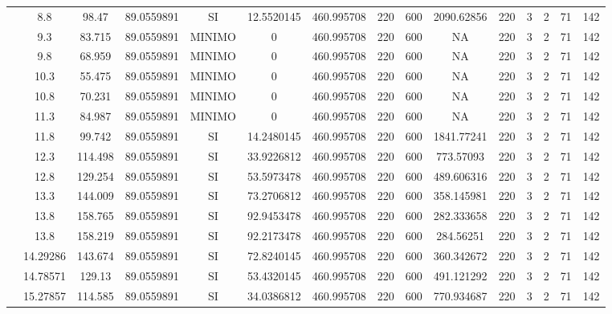 \begin{table}[H]
{\begin{tabular}{|c|c|c|c|c|c|c|c|c|c|c|c|c|c|c|}
\cline{2-15}    & 8.8 & 98.47 & 89.0559891 & SI  & 12.5520145 & 460.995708 & 220 & 600 & 2090.62856 & 220 & 3   & 2   & 71  & 142 \bigstrut\\
\cline{2-15}    & 9.3 & 83.715 & 89.0559891 & MINIMO & 0   & 460.995708 & 220 & 600 & NA  & 220 & 3   & 2   & 71  & 142 \bigstrut\\
\cline{2-15}    & 9.8 & 68.959 & 89.0559891 & MINIMO & 0   & 460.995708 & 220 & 600 & NA  & 220 & 3   & 2   & 71  & 142 \bigstrut\\
\cline{2-15}    & 10.3 & 55.475 & 89.0559891 & MINIMO & 0   & 460.995708 & 220 & 600 & NA  & 220 & 3   & 2   & 71  & 142 \bigstrut\\
\cline{2-15}    & 10.8 & 70.231 & 89.0559891 & MINIMO & 0   & 460.995708 & 220 & 600 & NA  & 220 & 3   & 2   & 71  & 142 \bigstrut\\
\cline{2-15}    & 11.3 & 84.987 & 89.0559891 & MINIMO & 0   & 460.995708 & 220 & 600 & NA  & 220 & 3   & 2   & 71  & 142 \bigstrut\\
\cline{2-15}    & 11.8 & 99.742 & 89.0559891 & SI  & 14.2480145 & 460.995708 & 220 & 600 & 1841.77241 & 220 & 3   & 2   & 71  & 142 \bigstrut\\
\cline{2-15}    & 12.3 & 114.498 & 89.0559891 & SI  & 33.9226812 & 460.995708 & 220 & 600 & 773.57093 & 220 & 3   & 2   & 71  & 142 \bigstrut\\
\cline{2-15}    & 12.8 & 129.254 & 89.0559891 & SI  & 53.5973478 & 460.995708 & 220 & 600 & 489.606316 & 220 & 3   & 2   & 71  & 142 \bigstrut\\
\cline{2-15}    & 13.3 & 144.009 & 89.0559891 & SI  & 73.2706812 & 460.995708 & 220 & 600 & 358.145981 & 220 & 3   & 2   & 71  & 142 \bigstrut\\
\cline{2-15}    & 13.8 & 158.765 & 89.0559891 & SI  & 92.9453478 & 460.995708 & 220 & 600 & 282.333658 & 220 & 3   & 2   & 71  & 142 \bigstrut\\
\cline{2-15}    & 13.8 & 158.219 & 89.0559891 & SI  & 92.2173478 & 460.995708 & 220 & 600 & 284.56251 & 220 & 3   & 2   & 71  & 142 \bigstrut\\
\cline{2-15}    & 14.29286 & 143.674 & 89.0559891 & SI  & 72.8240145 & 460.995708 & 220 & 600 & 360.342672 & 220 & 3   & 2   & 71  & 142 \bigstrut\\
\cline{2-15}    & 14.78571 & 129.13 & 89.0559891 & SI  & 53.4320145 & 460.995708 & 220 & 600 & 491.121292 & 220 & 3   & 2   & 71  & 142 \bigstrut\\
\cline{2-15}    & 15.27857 & 114.585 & 89.0559891 & SI  & 34.0386812 & 460.995708 & 220 & 600 & 770.934687 & 220 & 3   & 2   & 71  & 142 \bigstrut\\

\end{tabular}}
\end{table}
